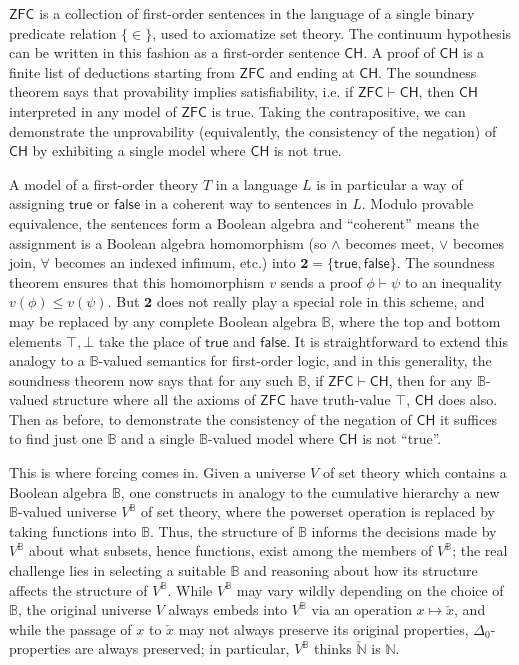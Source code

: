 \documentclass[a4paper,USenglish,cleveref, autoref]{lipics-v2019}
\newcommand{\B}{\mathbb{B}}
\begin{document}
$\mathsf{ZFC}$ is a collection of first-order sentences in the language of a single binary predicate relation $\{\in\}$, used to axiomatize set theory. The continuum hypothesis can be written in this fashion as a first-order sentence $\mathsf{CH}$. A proof of $\mathsf{CH}$ is a finite list of deductions starting from $\mathsf{ZFC}$ and ending at $\mathsf{CH}$. %
The soundness theorem says that provability implies satisfiability, i.e. if $\mathsf{ZFC} \vdash \mathsf{CH}$, then $\mathsf{CH}$ interpreted in any model of $\mathsf{ZFC}$ is true. Taking the contrapositive, we can demonstrate the unprovability (equivalently, the consistency of the negation) of $\mathsf{CH}$ by exhibiting a single model where $\mathsf{CH}$ is not true.

A model of a first-order theory $T$ in a language $L$ is in particular a way of assigning $\mathsf{true}$ or $\mathsf{false}$ in a coherent way to sentences in $L$. Modulo provable equivalence, the sentences form a Boolean algebra and ``coherent'' means the assignment is a Boolean algebra homomorphism (so $\land$ becomes meet, $\lor$ becomes join, $\forall$ becomes an indexed infimum, etc.) into $\mathbf{2} = \{\mathsf{true}, \mathsf{false}\}$. The soundness theorem ensures that this homomorphism $v$ sends a proof $\phi \vdash \psi$ to an inequality $v(\phi) \leq v(\psi)$. But $\mathbf{2}$ does not really play a special role in this scheme, and may be replaced by any complete Boolean algebra $\B$, where the top and bottom elements $\top, \bot$ take the place of $\mathsf{true}$ and $\mathsf{false}$. It is straightforward to extend this analogy to a $\B$-valued semantics for first-order logic, and in this generality, the soundness theorem now says that for any such $\B$, if $\mathsf{ZFC} \vdash \mathsf{CH}$, then for any $\B$-valued structure where all the axioms of $\mathsf{ZFC}$ have truth-value $\top$, $\mathsf{CH}$ does also. Then as before, to demonstrate the consistency of the negation of $\mathsf{CH}$ it suffices to find just one $\mathbb{B}$ and a single $\mathbb{B}$-valued model where $\mathsf{CH}$ is not ``true''.

This is where forcing comes in. Given a universe $V$ of set theory which contains a Boolean algebra $\B$, one constructs in analogy to the cumulative hierarchy a new $\B$-valued universe $V^\B$ of set theory, where the powerset operation is replaced by taking functions into $\B$. Thus, the structure of $\B$ informs the decisions made by $V^\B$ about what subsets, hence functions, exist among the members of $V^\B$; the real challenge lies in selecting a suitable $\B$ and reasoning about how its structure affects the structure of $V^\B$. While $V^\B$ may vary wildly depending on the choice of $\B$, the original universe $V$ always embeds into $V^\B$ via an operation $x \mapsto \check{x}$, and while the passage of $x$ to $\check{x}$ may not always preserve its original properties, $\Delta_0$-properties are always preserved; in particular, $V^\B$ thinks $\check{\mathbb{N}}$ is $\mathbb{N}$.
\end{document}

